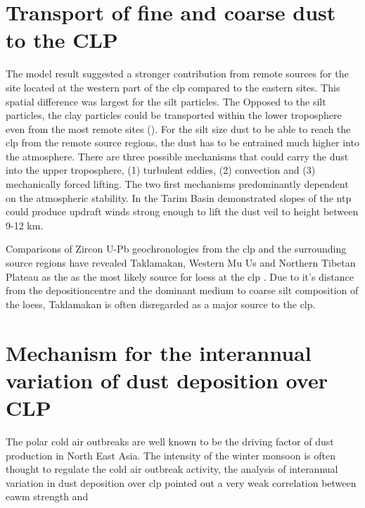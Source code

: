 \section{Transport of fine and coarse dust to the CLP}
The model result suggested a stronger contribution from remote sources for the site located at the western part of the \acrshort{clp} compared to the eastern sites. This spatial difference was largest for the silt particles. The   
Opposed to the silt particles, the clay particles could be transported within the lower troposphere even from the most remote sites ().  For the silt size dust to be able to reach the \acrshort{clp} from the remote source regions, the dust has to be entrained much higher into the atmosphere. There are three possible mechanisms that could carry the dust into the upper troposphere, (1) turbulent eddies, (2) convection and (3) mechanically forced lifting. The two first mechanisms predominantly dependent on the atmospheric stability. In the Tarim Basin \textcite{yumimoto_elevated_2009} demonstrated slopes of the \acrfull{ntp} could produce updraft winds strong enough to lift the dust veil to height between 9-12 km. 

Comparisons of Zircon U-Pb geochronologies from the \acrshort{clp} and the surrounding source regions have revealed Taklamakan, Western Mu Us and Northern Tibetan Plateau as the as the most likely source for loess at the \acrshort{clp} \parencite{bird2015quaternary}. Due to it's distance from the depositioncentre and the dominant medium to coarse silt composition of the loess, Taklamakan is often disregarded as a major source to the \acrshort{clp}.                 




\section{Mechanism for the interannual variation of dust deposition over CLP }
The polar cold air outbreaks are well known to be the driving factor of dust production in North East Asia. The intensity of the winter monsoon is often thought to regulate the cold air outbreak activity, the analysis of interannual variation in dust deposition over \acrshort{clp} pointed out a very weak correlation between \acrshort{eawm} strength and  


